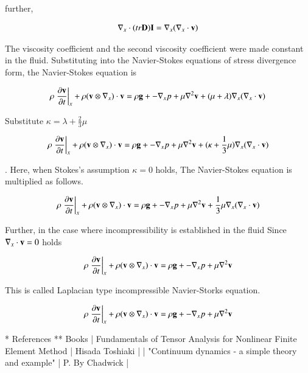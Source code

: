 further,

\begin{eqnarray}
\nabla_x \cdot (tr{\mathbf{D}}){\mathbf{I}}  =  \nabla_x ( \nabla_x \cdot {\mathbf{v}} )
\end{eqnarray}

The viscosity coefficient and the second viscosity coefficient were made constant in the fluid. Substituting into the Navier-Stokes equations of stress divergence form, the Navier-Stokes equation is

\begin{eqnarray}
\rho\left.\frac{\partial {\mathbf{v}}}{\partial t} \right|_x + \rho({\mathbf{v}} \otimes \nabla_x ) \cdot {\mathbf{v}}  =  \rho {\mathbf{g}}+ -\nabla_x p+\mu \nabla^2 {\mathbf{v}}+(\mu+\lambda) \nabla_x ( \nabla_x \cdot {\mathbf{v}} )
\end{eqnarray}

Substitute $\kappa=\lambda+\frac{2}{3}\mu$

\begin{eqnarray}
\rho\left.\frac{\partial {\mathbf{v}}}{\partial t} \right|_x + \rho({\mathbf{v}} \otimes \nabla_x ) \cdot {\mathbf{v}}  =  \rho {\mathbf{g}}+ -\nabla_x p+\mu \nabla^2 {\mathbf{v}}+(\kappa+\frac{1}{3}\mu) \nabla_x ( \nabla_x \cdot {\mathbf{v}} )
\end{eqnarray}

. Here, when Stokes's assumption $\kappa=0$ holds,
The Navier-Stokes equation is multiplied as follows.

\begin{eqnarray}
\rho\left.\frac{\partial {\mathbf{v}}}{\partial t} \right|_x + \rho({\mathbf{v}} \otimes \nabla_x ) \cdot {\mathbf{v}}  =  \rho {\mathbf{g}} + -\nabla_x p + \mu \nabla^2 {\mathbf{v}}+\frac{1}{3}\mu \nabla_x ( \nabla_x \cdot {\mathbf{v}} )
\end{eqnarray}

Further, in the case where incompressibility is established in the fluid
Since $\nabla_x \cdot {\bf{v}}=0$ holds

\begin{eqnarray}
\rho\left.\frac{\partial {\mathbf{v}}}{\partial t} \right|_x + \rho({\mathbf{v}} \otimes \nabla_x ) \cdot {\mathbf{v}}  =  \rho {\mathbf{g}}+ -\nabla_x p+\mu \nabla^2 {\mathbf{v}}
\end{eqnarray}

This is called Laplacian type incompressible Navier-Storks equation.


\begin{tcolorbox}[title=incompressible Navier-Storkes equation]
\begin{eqnarray}
\rho\left.\frac{\partial {\mathbf{v}}}{\partial t} \right|_x + \rho({\mathbf{v}} \otimes \nabla_x ) \cdot {\mathbf{v}}  =  \rho {\mathbf{g}}+ -\nabla_x p+\mu \nabla^2 {\mathbf{v}}
\end{eqnarray}
\end{tcolorbox}

* References
** Books
| Fundamentals of Tensor Analysis for Nonlinear Finite Element Method | Hisada Toshiaki |
| "Continuum dynamics - a simple theory and example" | P. By Chadwick |
\fi






